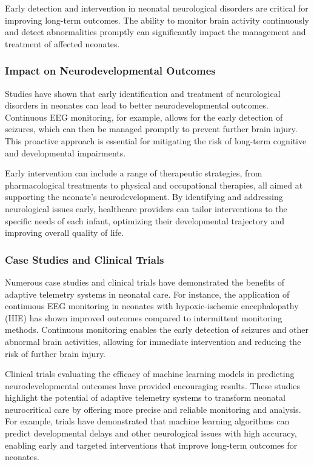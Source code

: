 \documentclass[12pt,journal,compsoc]{IEEEtran}
\begin{document}
Early detection and intervention in neonatal neurological disorders are critical for improving long-term outcomes. The ability to monitor brain activity continuously and detect abnormalities promptly can significantly impact the management and treatment of affected neonates.

\subsubsection{Impact on Neurodevelopmental Outcomes}

Studies have shown that early identification and treatment of neurological disorders in neonates can lead to better neurodevelopmental outcomes. Continuous EEG monitoring, for example, allows for the early detection of seizures, which can then be managed promptly to prevent further brain injury. This proactive approach is essential for mitigating the risk of long-term cognitive and developmental impairments.

Early intervention can include a range of therapeutic strategies, from pharmacological treatments to physical and occupational therapies, all aimed at supporting the neonate's neurodevelopment. By identifying and addressing neurological issues early, healthcare providers can tailor interventions to the specific needs of each infant, optimizing their developmental trajectory and improving overall quality of life.

\subsubsection{Case Studies and Clinical Trials}

Numerous case studies and clinical trials have demonstrated the benefits of adaptive telemetry systems in neonatal care. For instance, the application of continuous EEG monitoring in neonates with hypoxic-ischemic encephalopathy (HIE) has shown improved outcomes compared to intermittent monitoring methods. Continuous monitoring enables the early detection of seizures and other abnormal brain activities, allowing for immediate intervention and reducing the risk of further brain injury.

Clinical trials evaluating the efficacy of machine learning models in predicting neurodevelopmental outcomes have provided encouraging results. These studies highlight the potential of adaptive telemetry systems to transform neonatal neurocritical care by offering more precise and reliable monitoring and analysis. For example, trials have demonstrated that machine learning algorithms can predict developmental delays and other neurological issues with high accuracy, enabling early and targeted interventions that improve long-term outcomes for neonates.
\end{document}
